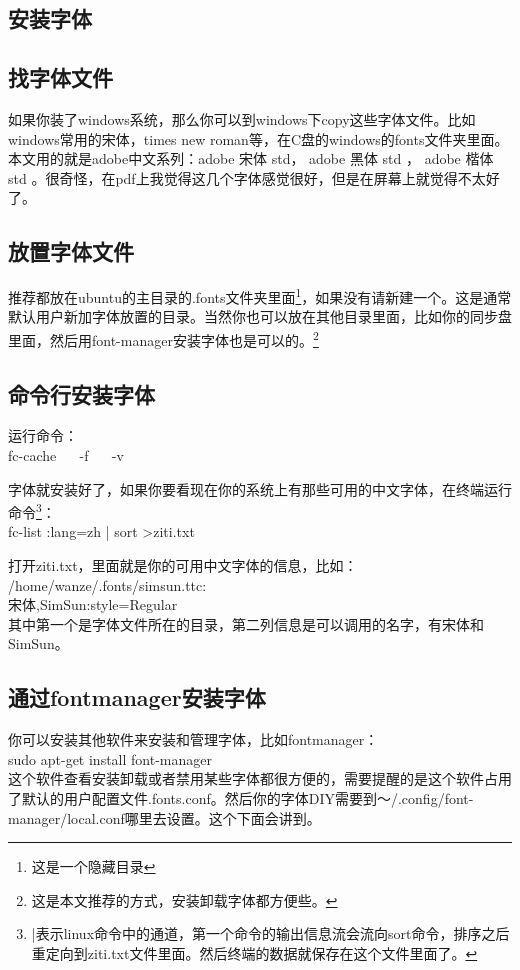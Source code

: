 \documentclass[11pt,oneside]{book}
\begin{document}
\begin{common-format}
\section{安装字体}
\label{sec:安装字体} 
\subsection{找字体文件}
如果你装了windows系统，那么你可以到windows下copy这些字体文件。比如windows常用的宋体，times new roman等，在C盘的windows的fonts文件夹里面。本文用的就是adobe中文系列：adobe 宋体 std， adobe 黑体 std ， adobe 楷体 std 。很奇怪，在pdf上我觉得这几个字体感觉很好，但是在屏幕上就觉得不太好了。

\subsection{放置字体文件}
推荐都放在ubuntu的主目录的.fonts文件夹里面\footnote{这是一个隐藏目录}，如果没有请新建一个。这是通常默认用户新加字体放置的目录。当然你也可以放在其他目录里面，比如你的同步盘里面，然后用font-manager安装字体也是可以的。\footnote{这是本文推荐的方式，安装卸载字体都方便些。}

\subsection{命令行安装字体}
运行命令：\\
fc-cache ~~ -f ~~ -v  

字体就安装好了，如果你要看现在你的系统上有那些可用的中文字体，在终端运行命令\footnote{|表示linux命令中的通道，第一个命令的输出信息流会流向sort命令，排序之后重定向到ziti.txt文件里面。然后终端的数据就保存在这个文件里面了。}：\\
fc-list :lang=zh | sort >ziti.txt 

打开ziti.txt，里面就是你的可用中文字体的信息，比如：\\
/home/wanze/.fonts/simsun.ttc: \\宋体,SimSun:style=Regular \\
其中第一个是字体文件所在的目录，第二列信息是可以调用的名字，有宋体和SimSun。

\subsection{通过fontmanager安装字体}
你可以安装其他软件来安装和管理字体，比如fontmanager：\\
sudo  apt-get install font-manager  \\
这个软件查看安装卸载或者禁用某些字体都很方便的，需要提醒的是这个软件占用了默认的用户配置文件.fonts.conf。然后你的字体DIY需要到～/.config/font-manager/local.conf哪里去设置。这个下面会讲到。


\end{common-format}
\end{document}
